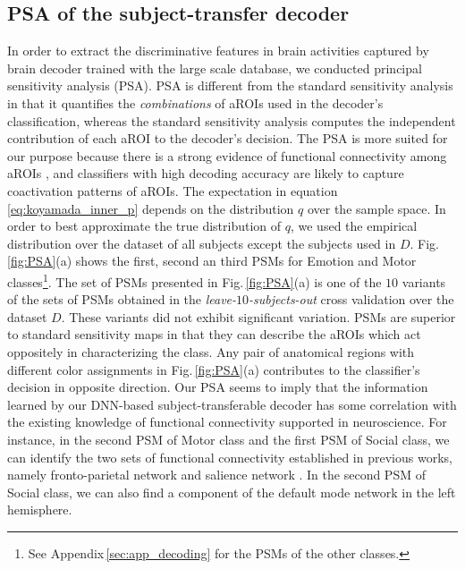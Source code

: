 \subsection{PSA of the subject-transfer decoder}
\label{PSA_of_dnn_decoder}
In order to extract the discriminative features in brain activities captured by brain decoder trained with the large scale database, we conducted principal sensitivity analysis (PSA).
%
PSA is different from the standard sensitivity analysis in that it quantifies the \textit{combinations} of aROIs used in the decoder's classification, whereas the standard sensitivity analysis computes the independent contribution of each aROI to the decoder's decision.
%
The PSA is more suited for our purpose because there is a strong evidence of functional connectivity among aROIs \cite{Buckner2013, Cole2014}, and classifiers with high decoding accuracy are likely to capture coactivation patterns of aROIs.
The expectation in equation\,\eqref{eq:koyamada_inner_p} depends on the distribution $q$ over the sample space.
%
In order to best approximate the true distribution of $q$, we used the empirical distribution over the dataset of all subjects except the subjects used in $D$.
Fig.\,\ref{fig:PSA}(a) shows the first, second an third PSMs for Emotion and Motor classes\footnote{See Appendix\,\ref{sec:app_decoding} for the PSMs of the other classes.}.
%
The set of PSMs presented in Fig.\,\ref{fig:PSA}(a) is one of the $10$ variants of the sets of PSMs obtained in the \textit{leave-$10$-subjects-out} cross validation over the dataset $D$.
%
These variants did not exhibit significant variation.
%
PSMs are superior to standard sensitivity maps in that they can describe the aROIs which act oppositely in characterizing the class.
%
Any pair of anatomical regions with different color assignments in Fig.\,\ref{fig:PSA}(a) contributes to the classifier's decision in opposite direction.
%
Our PSA seems to imply that the information learned by our DNN-based subject-transferable decoder has some correlation with the existing knowledge of functional connectivity supported in neuroscience.
%
For instance,  in the second PSM of Motor class and the first PSM of Social class,
we can identify the two sets of functional connectivity established in previous works, namely fronto-parietal network \cite{cole2013multi} and salience network \cite{taylor2009two}.
%
In the second PSM of Social class, we can also find a component of the default mode network \cite{raichle2007default, raichle2001default} in the left hemisphere.
